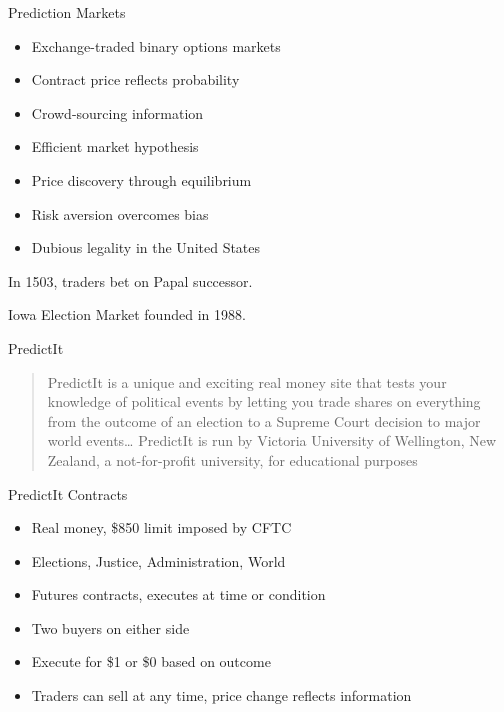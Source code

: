\documentclass[
  ignorenonframetext,
]{beamer}
\providecommand{\tightlist}{%
  \setlength{\itemsep}{0pt}\setlength{\parskip}{0pt}}
\begin{document}
\begin{frame}{Prediction Markets}
\protect\hypertarget{prediction-markets}{}

\begin{itemize}
\tightlist
\item
  Exchange-traded binary options markets
\item
  Contract price reflects probability
\item
  Crowd-sourcing information
\item
  Efficient market hypothesis
\item
  Price discovery through equilibrium
\item
  Risk aversion overcomes bias
\item
  Dubious legality in the United States
\end{itemize}

In 1503, traders bet on Papal successor.

Iowa Election Market founded in 1988.

\end{frame}

\begin{frame}{PredictIt}
\protect\hypertarget{predictit}{}

\begin{quote}
PredictIt is a unique and exciting real money site that tests your
knowledge of political events by letting you trade shares on everything
from the outcome of an election to a Supreme Court decision to major
world events\ldots{} PredictIt is run by Victoria University of
Wellington, New Zealand, a not-for-profit university, for educational
purposes
\end{quote}

\end{frame}

\begin{frame}{PredictIt Contracts}
\protect\hypertarget{predictit-contracts}{}

\begin{itemize}
\tightlist
\item
  Real money, \$850 limit imposed by CFTC
\item
  Elections, Justice, Administration, World
\item
  Futures contracts, executes at time or condition
\item
  Two buyers on either side
\item
  Execute for \$1 or \$0 based on outcome
\item
  Traders can sell at any time, price change reflects information
\end{itemize}

\end{frame}
\end{document}
